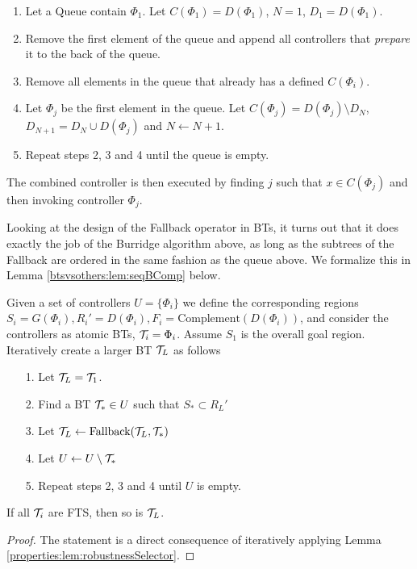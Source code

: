  
\begin{enumerate}
 \item Let a Queue contain $\Phi_1$. Let $C(\Phi_1)=D(\Phi_1)$, $N=1$, $D_1=D(\Phi_1)$.
 \item Remove the first element of the queue and append all controllers that \emph{prepare} it to the back of the queue.
 \item Remove all elements in the queue that already has a defined $C(\Phi_i)$.
 \item Let $\Phi_j$ be the first element in the queue. Let $C(\Phi_j)=D(\Phi_j) \setminus D_N$, $D_{N+1}=D_N \cup D(\Phi_j)$ and $N \leftarrow N+1$.
 \item Repeat steps 2, 3 and 4 until the queue is empty.
\end{enumerate}
 
The combined controller is then executed by finding $j$ such that $x \in C(\Phi_j)$ and then  invoking controller $\Phi_j$.
 
Looking at the design of the Fallback operator in BTs, it turns out that it does exactly the job of the Burridge algorithm above, as long as the subtrees of the Fallback are ordered in the same fashion as the queue above. We formalize this in  Lemma \ref{btsvsothers:lem:seqBComp} below.



\begin{lemma}
\label{btsvsothers:lem:seqBComp}
Given a set of controllers $U=\{\Phi_i\}$ we define the corresponding regions $S_i=G(\Phi_i), R_i'=D(\Phi_i), F_i=\mbox{Complement}(D(\Phi_i))$, and consider the controllers as atomic BTs, $\mathcal{T}_i=\Phi_i$.
Assume $S_1$ is the overall goal region.
 Iteratively create a larger BT $\mathcal{T}_L$ as follows
\begin{itemize}
 \item[1. ] Let  $\mathcal{T}_L=\mathcal{T}_1$. 
 \item[2. ] Find a BT $\mathcal{T}_*\in U$ such that $S_* \subset R_L'$
 \item[3. ] Let $\mathcal{T}_L \leftarrow \mbox{Fallback}(\mathcal{T}_L,\mathcal{T}_*)$
 \item[4. ] Let $U \leftarrow U \setminus \mathcal{T}_*$
 \item[5. ] Repeat steps 2, 3 and 4 until $U$ is empty.
\end{itemize}
If all $\mathcal{T}_i$ are FTS, then so is $\mathcal{T}_L$.
\end{lemma}
\begin{proof}
The statement is a direct consequence of iteratively applying Lemma \ref{properties:lem:robustnessSelector}.
\end{proof}

